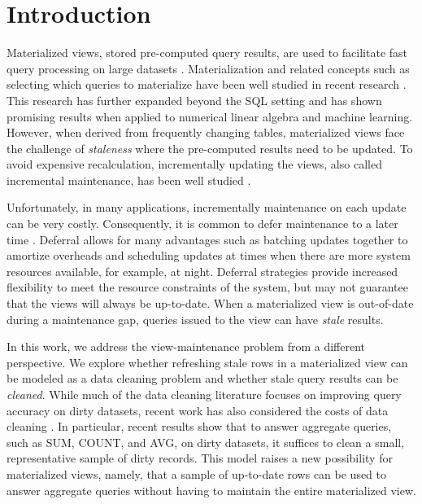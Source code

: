 \section{Introduction}
Materialized views, stored pre-computed query results, are used to facilitate fast query processing on large datasets \cite{gupta1995maintenance, chirkova2011materialized, halevy2001answering}.
Materialization and related concepts such as selecting which queries to materialize
have been well studied in recent research \cite{zaharia2012resilient,lefevre2014opportunistic, bailis2014scalable, perez2014history}.
This research has further expanded beyond the SQL setting \cite{nikolic2014linview, zhang2014mat} and 
has shown promising results when applied to numerical linear algebra and machine learning.
However, when derived from frequently changing tables,
materialized views face the challenge of \emph{staleness} where the pre-computed results need to be updated.
To avoid expensive recalculation, incrementally updating the views,
also called incremental maintenance, has been well studied \cite{gupta1995maintenance, chirkova2011materialized}.

Unfortunately, in many applications, incrementally maintenance on each update can be very costly. 
Consequently, it is common to defer maintenance to a later time \cite{chirkova2011materialized, zhou2007lazy}.
Deferral allows for many advantages such as batching updates together to amortize overheads and scheduling updates at times when there are more system resources available, for example, at night.
Deferral strategies provide increased flexibility to meet the resource constraints of the system, but may not guarantee that the views will always be up-to-date.
When a materialized view is out-of-date during a maintenance gap, queries issued to the view can have \emph{stale} results. 

In this work, we address the view-maintenance problem from a different perspective.
We explore whether refreshing stale rows in a materialized view can be modeled as a data cleaning problem and whether stale query results can be \emph{cleaned}.
While much of the data cleaning literature focuses on improving query accuracy on dirty datasets,
recent work has also considered the costs of data cleaning \cite{wang1999sample}.
In particular, recent results show that to answer aggregate queries, such as SUM, COUNT, and AVG, on dirty datasets, it suffices to clean a small, representative sample of dirty records.
This model raises a new possibility for materialized views, namely, that a sample of up-to-date rows can be used to answer aggregate queries without having to maintain the entire materialized view.

